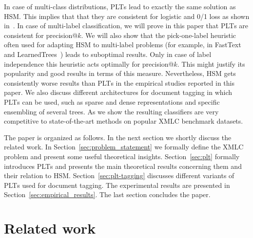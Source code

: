 \documentclass{article}
\newcommand{\Algo}[1]{\textsc{#1}}
\newcommand{\sectionBefore}{-0pt}
\newcommand{\sectionAfter}{-0pt}
\begin{document}

In case of multi-class distributions, \Algo{PLT}s lead to exactly the same solution as HSM. This implies that that they are consistent for logistic and 0/1 loss as shown in~\citep{Dembczynski_et_al_2016}. In case of multi-label classification, we will prove in this paper that \Algo{PLT}s are consistent for precision@$k$. We will also show that the pick-one-label heuristic often used for adapting \Algo{HSM} to multi-label problems (for example, in FastText~\citep{Joulin_et_al_2016} and LearnedTrees~\citep{Jernite_et_al_2017}) leads to suboptimal results. Only in case of label independence this heuristic acts optimally for precision@$k$. This might justify its popularity and good results in terms of this measure. Nevertheless, \Algo{HSM} gets consistently worse results than \Algo{PLT}s in the empirical studies reported in this paper. 
%
We also discuss different architectures for document tagging in which \Algo{PLT}s can be used, such as sparse and dense representations and specific ensembling of several trees. As we show the resulting classifiers are very competitive to state-of-the-art methods on popular XMLC benchmark datasets. 

The paper is organized as follows. In the next section we shortly discuss the related work. In Section~\ref{sec:problem_statement} we formally define the XMLC problem and present some useful theoretical insights. Section~\ref{sec:plt} formally introduces \Algo{PLT}s and presents the main theoretical results concerning them and their relation to \Algo{HSM}. Section~\ref{sec:plt-tagging} discusses different variants of \Algo{PLT}s used for document tagging. The experimental results are presented in Section~\ref{sec:empirical_results}. The last section concludes the paper. 


\vspace{\sectionBefore}
\section{Related work}
\label{sec:related_work}
\vspace{\sectionAfter}
\end{document}
